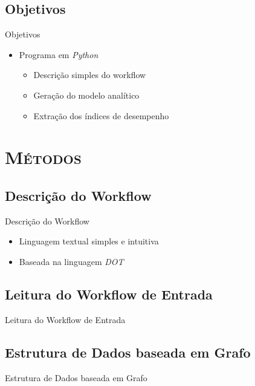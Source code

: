 \documentclass[xcolor=x11names,compress]{beamer}
\renewcommand{\(}{\begin{columns}}
\renewcommand{\)}{\end{columns}}
\newcommand{\<}[1]{\begin{column}{#1}}
\renewcommand{\>}{\end{column}}
\begin{document}
    \subsection{Objetivos}
        \begin{frame}{Objetivos}
            \begin{itemize}[<+->]
                \item Programa em \emph{Python}
                    \begin{itemize}
                        \item Descrição simples do workflow
                        \item Geração do modelo analítico
                        \item Extração dos índices de desempenho
                    \end{itemize}
            \end{itemize}
        \end{frame}

\section{\scshape Métodos}

    \subsection{Descrição do Workflow}
        \begin{frame}{Descrição do Workflow}
            \begin{itemize}[<+->]
                \item Linguagem textual simples e intuitiva
                \item Baseada na linguagem \emph{DOT}
            \end{itemize}
        \end{frame}

    \subsection{Leitura do Workflow de Entrada}
        \begin{frame}{Leitura do Workflow de Entrada}

        \end{frame}

    \subsection{Estrutura de Dados baseada em Grafo}
        \begin{frame}{Estrutura de Dados baseada em Grafo}

        \end{frame}
\end{document}
